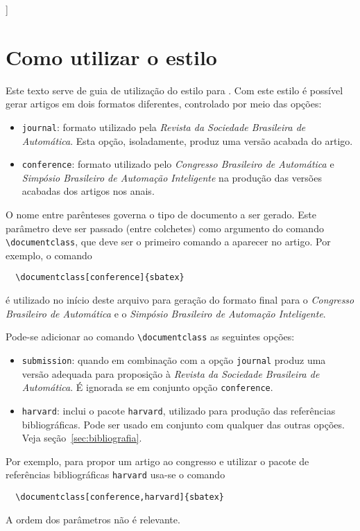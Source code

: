 \documentclass[conference,harvard,brazil,english]{sbatex}
\begin{document}
]



\section{Como utilizar o estilo \SBATeX}
Este texto serve de guia de utilização do estilo \SBATeX para
\LaTeXe. Com este estilo é possível gerar artigos em dois formatos
diferentes, controlado por meio das opções:
\begin{itemize}
  \item \verb+journal+: formato utilizado pela \emph{Revista da
  Sociedade Brasileira de Automática}. Esta opção, isoladamente,
  produz uma versão acabada do artigo.

  \item \verb+conference+: formato utilizado pelo \emph{Congresso
  Brasileiro de Automática} e \emph{Simpósio Brasileiro de Automação Inteligente} na produção das versões acabadas dos artigos
  nos anais.
\end{itemize}
O nome entre parênteses governa o tipo de documento a ser gerado. Este
parâmetro deve ser passado (entre colchetes) como argumento do comando
\verb+\documentclass+, que deve ser o primeiro comando a aparecer no
artigo. Por exemplo, o comando
\begin{verbatim}
  \documentclass[conference]{sbatex}
\end{verbatim}
é utilizado no início deste arquivo para geração do formato final
para o \emph{Congresso Brasileiro de Automática} e o
\emph{Simpósio Brasileiro de Automação Inteligente}.

Pode-se adicionar ao comando \verb+\documentclass+ as seguintes
opções:
\begin{itemize}
  \item \verb+submission+: quando em combinação com a opção
  \verb+journal+ produz uma versão adequada para proposição à
  \emph{Revista da Sociedade Brasileira de Automática}. É ignorada se em
  conjunto opção \verb+conference+.

  \item \verb+harvard+: inclui o pacote \verb+harvard+, utilizado para
  produção das referências bibliográficas. Pode ser usado em conjunto
  com qualquer das outras opções. Veja seção~\ref{sec:bibliografia}.
\end{itemize}
Por exemplo, para propor um artigo ao congresso e utilizar o pacote de
referências bibliográficas \verb+harvard+ usa-se o comando
\begin{verbatim}
  \documentclass[conference,harvard]{sbatex}
\end{verbatim}
A ordem dos parâmetros não é relevante.
\end{document}
